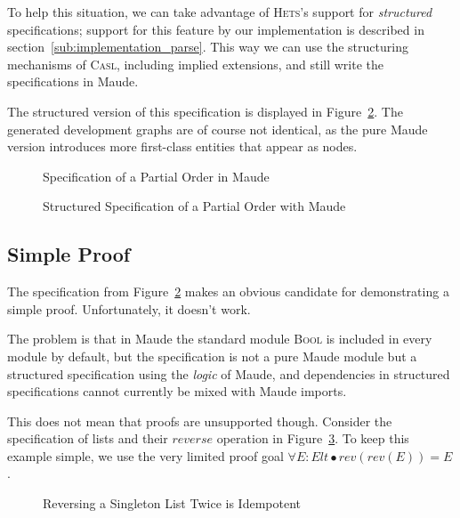 \documentclass[11pt]{article}
\newcommand{\Casl}{\textsc{Casl}}
\newcommand{\Hets}{\textsc{Hets}}
\begin{document}
To help this situation, we can take advantage of \Hets{}'s support for \emph{structured} specifications; support for this feature by our implementation is described in section~\ref{sub:implementation_parse}. This way we can use the structuring mechanisms of \Casl{}, including implied extensions, and still write the specifications in Maude.

The structured version of this specification is displayed in Figure~\ref{fig:spec-maude-het}. The generated development graphs are of course not identical, as the pure Maude version introduces more first-class entities that appear as nodes.

\begin{figure}
  \begin{alltt}\small{}\end{alltt}
  \caption{Specification of a Partial Order in Maude}\label{fig:spec-maude-hom}
\end{figure}

\begin{figure}
  
  \caption{Structured Specification of a Partial Order with Maude}\label{fig:spec-maude-het}
\end{figure}


\subsection{Simple Proof}
\label{sub:results_proof_simple}

The specification from Figure~\ref{fig:spec-maude-het} makes an obvious candidate for demonstrating a simple proof. Unfortunately, it doesn't work.

The problem is that in Maude the standard module \textsc{Bool} is included in every module by default, but the specification is not a pure Maude module but a structured specification using the \emph{logic} of Maude, and dependencies in structured specifications cannot currently be mixed with Maude imports.

This does not mean that proofs are unsupported though. Consider the specification of lists and their $reverse$ operation in Figure~\ref{fig:revelt-spec}. To keep this example simple, we use the very limited proof goal $\forall{E : Elt} \bullet rev(rev(E)) = E$.

\begin{figure}
  
  \caption{Reversing a Singleton List Twice is Idempotent}\label{fig:revelt-spec}
\end{figure}
\end{document}
